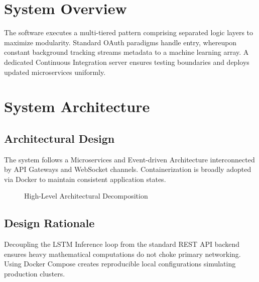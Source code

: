 \documentclass[12pt, a4paper]{article}
\begin{document}
\newpage
\section{System Overview}
The software executes a multi-tiered pattern comprising separated logic layers to maximize modularity. Standard OAuth paradigms handle entry, whereupon constant background tracking streams metadata to a machine learning array. A dedicated Continuous Integration server ensures testing boundaries and deploys updated microservices uniformly. 

\newpage
\section{System Architecture}

\subsection{Architectural Design}
The system follows a Microservices and Event-driven Architecture interconnected by API Gateways and WebSocket channels. Containerization is broadly adopted via Docker to maintain consistent application states.

\begin{figure}[H]
    \centering
    \caption{High-Level Architectural Decomposition}
\end{figure}

\subsection{Design Rationale}
Decoupling the LSTM Inference loop from the standard REST API backend ensures heavy mathematical computations do not choke primary networking. Using Docker Compose creates reproducible local configurations simulating production clusters.
\end{document}
